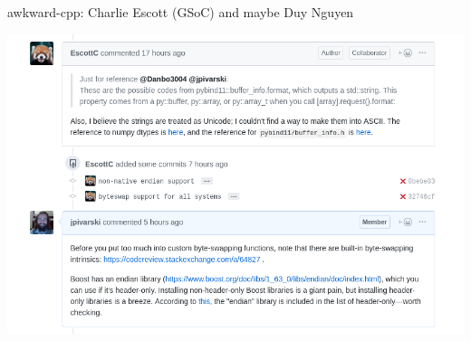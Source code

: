 \documentclass[aspectratio=169]{beamer}
\begin{document}
\begin{frame}{awkward-cpp: Charlie Escott (GSoC) and maybe Duy Nguyen}
\begin{center}
\includegraphics[width=0.9\linewidth]{awkward-cpp-ongoing.png}
\end{center}
\end{frame}
\end{document}
